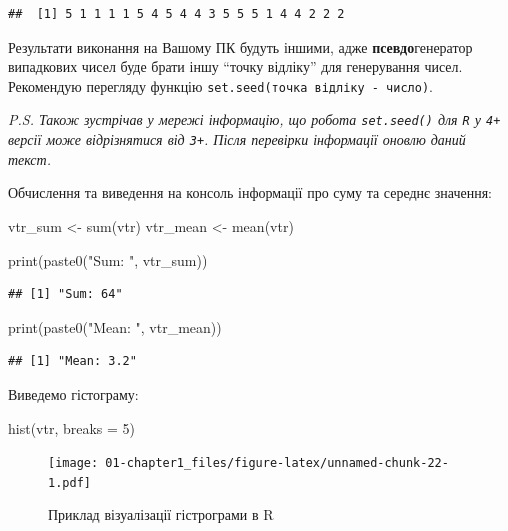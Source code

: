 \documentclass[
]{book}
\newenvironment{Shaded}{\begin{snugshade}}{\end{snugshade}}
\newcommand{\AttributeTok}[1]{\textcolor[rgb]{0.77,0.63,0.00}{#1}}
\newcommand{\DecValTok}[1]{\textcolor[rgb]{0.00,0.00,0.81}{#1}}
\newcommand{\FunctionTok}[1]{\textcolor[rgb]{0.00,0.00,0.00}{#1}}
\newcommand{\NormalTok}[1]{#1}
\newcommand{\OtherTok}[1]{\textcolor[rgb]{0.56,0.35,0.01}{#1}}
\newcommand{\StringTok}[1]{\textcolor[rgb]{0.31,0.60,0.02}{#1}}
\begin{document}
\begin{verbatim}
##  [1] 5 1 1 1 1 5 4 5 4 4 3 5 5 5 1 4 4 2 2 2
\end{verbatim}

Результати виконання на Вашому ПК будуть іншими, адже \textbf{псевдо}генератор випадкових чисел буде брати іншу ``точку відліку'' для генерування чисел. Рекомендую перегляду функцію \texttt{set.seed(точка\ відліку\ -\ число)}.

\emph{P.S. Також зустрічав у мережі інформацію, що робота \texttt{set.seed()} для \texttt{R} у \texttt{4+} версії може відрізнятися від \texttt{3+}. Після перевірки інформації оновлю даний текст.}

Обчислення та виведення на консоль інформації про суму та середнє значення:

\begin{Shaded}
\begin{Highlighting}[]
\NormalTok{vtr\_sum }\OtherTok{\textless{}{-}} \FunctionTok{sum}\NormalTok{(vtr)}
\NormalTok{vtr\_mean }\OtherTok{\textless{}{-}} \FunctionTok{mean}\NormalTok{(vtr)}

\FunctionTok{print}\NormalTok{(}\FunctionTok{paste0}\NormalTok{(}\StringTok{"Sum: "}\NormalTok{, vtr\_sum))}
\end{Highlighting}
\end{Shaded}

\begin{verbatim}
## [1] "Sum: 64"
\end{verbatim}

\begin{Shaded}
\begin{Highlighting}[]
\FunctionTok{print}\NormalTok{(}\FunctionTok{paste0}\NormalTok{(}\StringTok{"Mean: "}\NormalTok{, vtr\_mean))}
\end{Highlighting}
\end{Shaded}

\begin{verbatim}
## [1] "Mean: 3.2"
\end{verbatim}

Виведемо гістограму:

\begin{Shaded}
\begin{Highlighting}[]
\FunctionTok{hist}\NormalTok{(vtr, }\AttributeTok{breaks =} \DecValTok{5}\NormalTok{)}
\end{Highlighting}
\end{Shaded}

\begin{figure}
\centering
\texttt{[image: 01-chapter1\_files/figure-latex/unnamed-chunk-22-1.pdf]}
\caption{\label{fig:unnamed-chunk-22}Приклад візуалізації гістрограми в R}
\end{figure}
\end{document}
